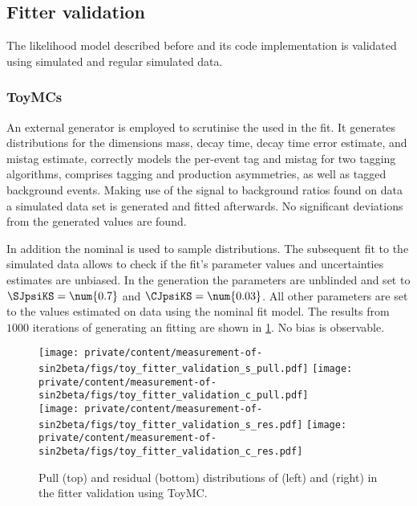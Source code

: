 \subsection{Fitter validation}
\label{sec:measurement_of_sin2beta:likelihood_fit:validation}

The likelihood model described before and its code implementation is validated
using \ToyMC simulated and regular \MC simulated data.

\subsubsection{\Aclp{ToyMC}}
\label{sec:measurement_of_sin2beta:likelihood_fit:validation:toy_mc}

An external \ToyMC generator \cite{wishahi:2015bhf} is employed to scrutinise
the \PDF used in the fit. It generates distributions for the dimensions mass,
decay time, decay time error estimate, and mistag estimate, correctly models
the per-event tag and mistag for two tagging algorithms, comprises tagging and
production asymmetries, as well as tagged background events. Making use of the
signal to background ratios found on data a simulated data set is generated and
fitted afterwards. No significant deviations from the generated values are
found.

In addition the nominal \PDF is used to sample distributions. The subsequent fit
to the simulated data allows to check if the fit's parameter values and
uncertainties estimates are unbiased. In the generation the \CP parameters are
unblinded and set to $\SJpsiKS = \num{0.7}$ and $\CJpsiKS = \num{0.03}$. All
other parameters are set to the values estimated on data using the nominal fit
model. The results from $\num{1000}$ iterations of generating an fitting are
shown in \cref{fig:measurement_of_sin2beta:likelihood_fit:validation:toy_mc}. No
bias is observable.
%
\begin{figure}[ht]
\centering
\texttt{[image: private/content/measurement-of-sin2beta/figs/toy\_fitter\_validation\_s\_pull.pdf]}
\texttt{[image: private/content/measurement-of-sin2beta/figs/toy\_fitter\_validation\_c\_pull.pdf]}     \\
\texttt{[image: private/content/measurement-of-sin2beta/figs/toy\_fitter\_validation\_s\_res.pdf]}
\texttt{[image: private/content/measurement-of-sin2beta/figs/toy\_fitter\_validation\_c\_res.pdf]}
\caption{Pull (top) and residual (bottom) distributions of \SJpsiKS (left) and
\CJpsiKS (right) in the fitter validation using \ac{ToyMC}.}
\label{fig:measurement_of_sin2beta:likelihood_fit:validation:toy_mc}
\end{figure}

